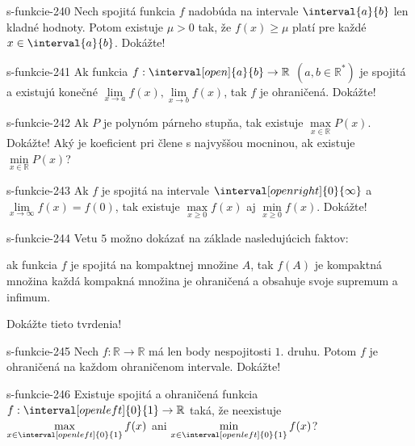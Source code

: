 \begin{defproblem}{s-funkcie-240}
Nech spojitá funkcia $f$ nadobúda na intervale $\interval{a}{b}$ len kladné
hodnoty. Potom existuje $\mu > 0$ tak, že $f(x) \geq \mu$ platí pre každé $x \in
\interval{a}{b}$. Dokážte!
\end{defproblem}

\begin{defproblem}{s-funkcie-241}
Ak funkcia $f: \interval[open]{a}{b} \rightarrow \mathbb{R}$ $(a,b\in
\mathbb{R^*})$ je spojitá a existujú konečné $\lim\limits_{x \rightarrow
a}f(x),\lim\limits_{x \rightarrow b}f(x)$, tak $f$ je ohraničená. Dokážte!
\end{defproblem}

\begin{defproblem}{s-funkcie-242}
Ak $P$ je polynóm párneho stupňa, tak existuje $\max\limits_{x \in \mathbb{R}}
P(x)$. Dokážte! Aký je koeficient pri člene s najvyššou mocninou, ak existuje
$\min\limits_{x \in \mathbb{R}} P(x)$?
\end{defproblem}

\begin{defproblem}{s-funkcie-243}
Ak $f$ je spojitá na intervale $\interval[open right]{0}{\infty}$ a
$\lim\limits_{x \rightarrow \infty} f(x)=f(0)$, tak existuje $\max\limits_{x
\geq 0} f(x)$ aj $\min\limits_{x \geq 0}f(x)$. Dokážte!
\end{defproblem}

\begin{defproblem}{s-funkcie-244}
Vetu $5$ možno dokázať na základe nasledujúcich faktov:
\begin{tasks}
\task
  ak funkcia $f$ je spojitá na kompaktnej množine $A$, tak $f(A)$ je
  kompaktná množina
\task
  každá kompakná množina je ohraničená a obsahuje svoje supremum a infimum.
\end{tasks}
Dokážte tieto tvrdenia!
\end{defproblem}

\begin{defproblem}{s-funkcie-245}
Nech $f: \mathbb{R} \rightarrow \mathbb{R}$ má len body nespojitosti $1.$ druhu.
Potom $f$ je ohraničená na každom ohraničenom intervale. Dokážte!
\end{defproblem}

\begin{defproblem}{s-funkcie-246}
Existuje spojitá a ohraničená funkcia $f:\interval[open left]{0}{1} \rightarrow
\mathbb{R}$ taká, že neexistuje $\max\limits_{x \in \interval[open left]{0}{1}}
f(x)$ ani $\min\limits_{x \in \interval[open left]{0}{1}} f(x)$?
\end{defproblem}

